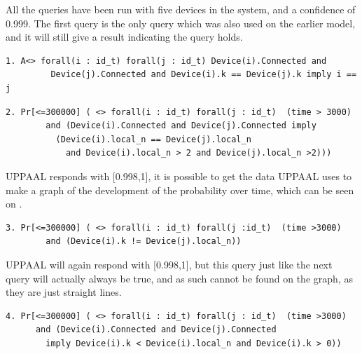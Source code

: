 All the queries have been run with five devices in the system, and a confidence of 0.999.
The first query is the only query which was also used on the earlier model, and it will still give a result indicating the query holds.

\begin{lstlisting}[style=UPPAAL, title={This query requires that eventually if all devices are connected, then no pair of devices have the same \texttt{k}, unless the pair consists of the same two devices.}]
1. A<> forall(i : id_t) forall(j : id_t) Device(i).Connected and
         Device(j).Connected and Device(i).k == Device(j).k imply i == j
\end{lstlisting}


\begin{lstlisting}[style=UPPAAL, title={This query asks after 3000 UPPAAL time units has passed, what then is the probability that if two devices \texttt{i}, and \texttt{j} are connected to a network that  their local values of \texttt{n} are the same, and that they are both larger than 2. The query will keep checking the probability until it has been found to be 100\% certain or until 300000 UPPAAL time units has passed.}]
2. Pr[<=300000] ( <> forall(i : id_t) forall(j : id_t)  (time > 3000) 
	  	and (Device(i).Connected and Device(j).Connected imply 
	  	  (Device(i).local_n == Device(j).local_n 
	  		and Device(i).local_n > 2 and Device(j).local_n >2)))
\end{lstlisting}
\noindent
UPPAAL responds with [0.998,1], it is possible to get the data UPPAAL uses to make a graph of the development of the probability over time, which can be seen on .


\begin{lstlisting}[style=UPPAAL, title={This query asks after 3000 UPPAAL time units has passed, what then is the probability that a device \texttt{i} has a value \texttt{k} which is different from a device \texttt{j}s value of \texttt{n}}]
3. Pr[<=300000] ( <> forall(i : id_t) forall(j :id_t)  (time >3000) 
		and (Device(i).k != Device(j).local_n))
\end{lstlisting}
UPPAAL will again respond with [0.998,1], but this query just like the next query will actually always be true, and as such cannot be found on the graph, as they are just straight lines.

\begin{lstlisting}[style=UPPAAL, title={This query asks after 3000 UPPAAL time units has passed, what then is the probability that if a device \texttt{i} and a device \texttt{j} is both connected that then \texttt{i}'s values of \texttt{k} will be larger than zero and smaller than \texttt{n}}]
4. Pr[<=300000] ( <> forall(i : id_t) forall(j : id_t)  (time >3000) 
	  and (Device(i).Connected and Device(j).Connected 
	  	imply Device(i).k < Device(i).local_n and Device(i).k > 0))
\end{lstlisting}


